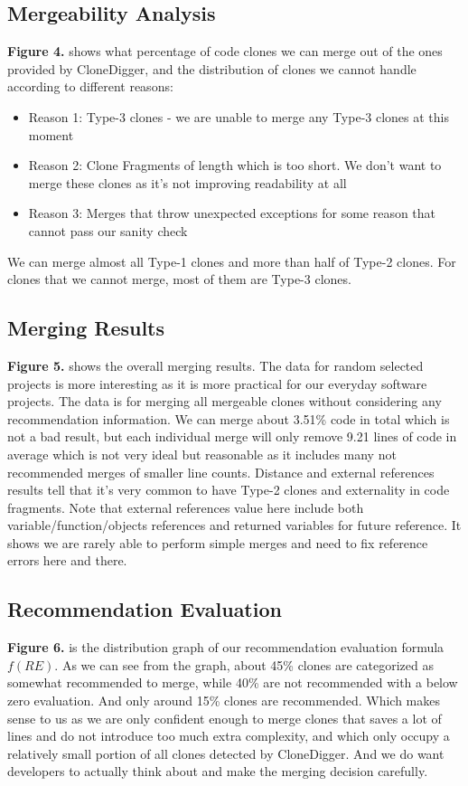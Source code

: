 \documentclass{acm_proc_article-sp}
\begin{document}
\subsection{Mergeability Analysis}
{\bf Figure 4.} shows what percentage of code clones we can merge out of the ones provided by CloneDigger, and the distribution of clones 
we cannot handle according to different reasons:
\begin{itemize}
\item Reason 1: Type-3 clones - we are unable to merge any Type-3 clones at this moment
\item Reason 2: Clone Fragments of length which is too short. We don't want to merge these clones as it's not improving readability at all
\item Reason 3: Merges that throw unexpected exceptions for some reason that cannot pass our sanity check
\end{itemize}
We can merge almost all Type-1 clones and more than half of Type-2 clones. For clones that we cannot merge, most of them are Type-3 clones.

\subsection{Merging Results}
{\bf Figure 5.} shows the overall merging results. The data for random selected projects is more interesting as it is more practical for our
everyday software projects. The data is for merging all mergeable clones without considering any recommendation information. 
We can merge about 3.51\% code in total which is not a bad result, but each individual merge will only remove 9.21 lines of code in average
which is not very ideal but reasonable as it includes many not recommended merges of smaller line counts. Distance and external references
results tell that it's very common to have Type-2 clones and externality in code fragments. Note that external references value here include both
variable/function/objects references and returned variables for future reference. It shows we are rarely able to perform simple merges and need
to fix reference errors here and there.

\subsection{Recommendation Evaluation}
{\bf Figure 6.} is the distribution graph of our recommendation evaluation formula $f(RE)$. As we can see from the graph, about 45\% clones
are categorized as somewhat recommended to merge, while 40\% are not recommended with a below zero evaluation. And only around 15\% clones
are recommended. Which makes sense to us as we are only confident enough to merge clones that saves a lot of lines and do not introduce too much
extra complexity, and which only occupy a relatively small portion of all clones detected by CloneDigger. And we do want developers to actually
think about and make the merging decision carefully.
\end{document}
